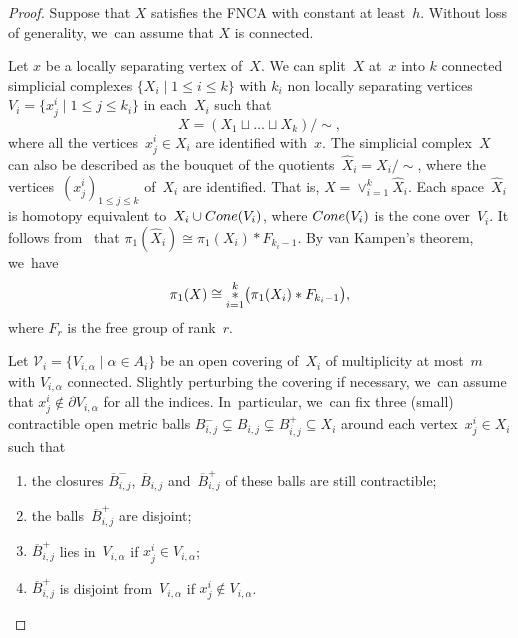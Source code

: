 \documentclass[11pt]{article}
\providecommand{\Asterisk}{\mathop{\ast}\displaylimits}
\providecommand{\widebar}[1]{\overline{#1}}
\theoremstyle{definition}
\numberwithin{equation}{section}
\begin{document}
\begin{proof}
Suppose that $X$ satisfies the FNCA with constant at least~$h$.
Without loss of generality, we~can assume that $X$ is connected.

Let $x$ be a locally separating vertex of~$X$.
We can split~$X$ at~$x$ into $k$ connected simplicial complexes $\{X_i \mid 1 \leq i \leq k\}$ with $k_i$ non locally separating vertices $V_i=\{x_j^i \mid 1 \leq j \leq k_i\}$ in each~$X_i$ such that
\[
X = (X_1 \sqcup \dots \sqcup X_k)/ \! \sim,
\]
where all the vertices~$x_j^i \in X_i$ are identified with~$x$.
The simplicial complex~$X$ can also be described as the bouquet of the quotients~$\widehat{X}_i=X_i/ \! \sim$, where the vertices~$(x_j^i)_{1 \leq j \leq k}$ of~$X_i$ are identified.
That is, $X = \vee_{i=1}^k \widehat{X}_i$.
Each space~$\widehat{X}_i$ is homotopy equivalent to~$X_i \cup {\rm Cone}(V_i)$, where ${\rm Cone}(V_i)$ is the cone over~$V_i$.
It follows from~\cite[Lem.\,3.4]{KRS} that $\pi_1(\widehat{X}_i) \cong \pi_1(X_i) * F_{k_i-1}$.
By van Kampen's theorem, we~have
\[
\pi_1(X) \cong \Asterisk_{i=1}^ k \bigl(\pi_1(X_i) * F_{k_i-1} \bigr),
\]
where $F_r$ is the free group of rank~$r$.

Let $\mathcal{V}_i = \{V_{i,\alpha} \mid \alpha \in A_i\}$ be an open covering of~$X_i$ of multiplicity at most~$m$ with $V_{i,\alpha}$ connected.
Slightly perturbing the covering if necessary, we~can assume that $x_j^i \notin \partial V_{i,\alpha}$ for all the indices. In~particular, we~can fix three (small) contractible open metric balls $B^-_{i,j} \subsetneq B_{i,j} \subsetneq B^+_{i,j} \subseteq X_i$ around each vertex~$x_j^i \in X_i$ such that
\begin{enumerate}
\item the closures $\widebar{B}^-_{i,j}$, $\widebar{B}_{i,j}$ and~$\widebar{B}^+_{i,j}$ of these balls are still contractible;
\item the balls~$\widebar{B}^+_{i,j}$ are disjoint;
\item $\widebar{B}^+_{i,j}$ lies in~$V_{i,\alpha}$ if $x_j^i \in V_{i,\alpha}$;
\item $\widebar{B}^+_{i,j}$ is disjoint from~$V_{i,\alpha}$ if $x_j^i \notin V_{i,\alpha}$.
\end{enumerate}


\end{proof}
\end{document}
